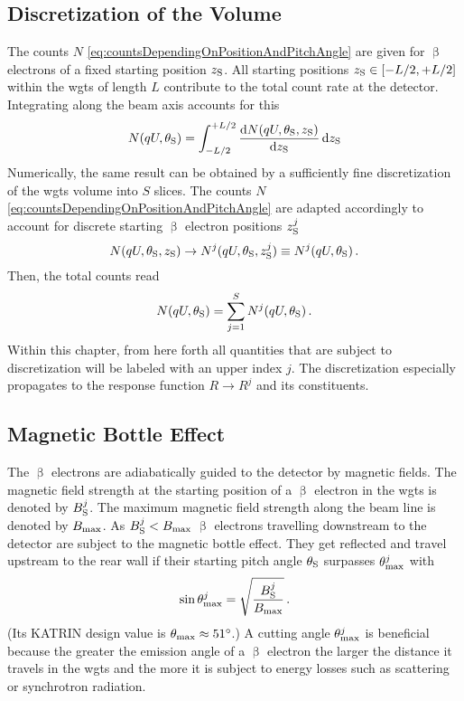 \subsection{Discretization of the  Volume}
\label{sec:sourceDiscretization}
The counts $N$ \eqref{eq:countsDependingOnPositionAndPitchAngle} are given for $\upbeta$ electrons of a fixed starting position $z_\mathrm{S}$.
All starting positions $z_\mathrm{S} \in [-L/2, +L/2]$ within the \gls{wgts} of length $L$ contribute to the total count rate at the detector. Integrating along the beam axis accounts for this
\begin{equation}
    N(qU, \theta_\mathrm{S}) = \int_{-L/2}^{+L/2} \frac{\mathop{}\!\mathrm{d} N(qU, \theta_\mathrm{S}, z_\mathrm{S})}{\mathop{}\!\mathrm{d} z_\mathrm{S}} \mathop{}\!\mathrm{d} z_\mathrm{S}
\end{equation}
Numerically, the same result can be obtained by a sufficiently fine discretization of the \gls{wgts} volume into $S$ slices. The counts $N$ \eqref{eq:countsDependingOnPositionAndPitchAngle} are adapted accordingly to account for discrete starting $\upbeta$ electron positions $z_\mathrm{S}^j$
\begin{equation}
    N(qU, \theta_\mathrm{S}, z_\mathrm{S}) \rightarrow N^j(qU, \theta_\mathrm{S},z_\mathrm{S}^j) \equiv N^j(qU, \theta_\mathrm{S}) \text{\,.}
\end{equation}
Then, the total counts read
\begin{equation}
    \label{eq:nonAveragedCounts}
    N(qU, \theta_\mathrm{S}) = \sum_{j=1}^S N^j(qU, \theta_\mathrm{S}) \text{\,.}
\end{equation}
Within this chapter, from here forth all quantities that are subject to discretization will be labeled with an upper index $j$. The discretization especially propagates to the response function $R \rightarrow R^j$ and its constituents.

\subsection{Magnetic Bottle Effect}
The $\upbeta$ electrons are adiabatically guided to the detector by magnetic fields. The magnetic field strength at the starting position of a $\upbeta$ electron in the \gls{wgts} is denoted by $B^j_\mathrm{S}$. The maximum magnetic field strength along the beam line is denoted by $B_\mathrm{max}$. As $B^j_\mathrm{S}<B_\mathrm{max}$ $\upbeta$ electrons travelling downstream to the detector are subject to the magnetic bottle effect. They get reflected and travel upstream to the rear wall if their starting pitch angle $\theta_\mathrm{S}$ surpasses $\theta_\mathrm{max}^j$ with
\begin{equation}
    \label{eq:thetaMax}
    \sin\theta_\mathrm{max}^j = \sqrt{\frac{B^j_\mathrm{S}}{B_\mathrm{max}}} \text{\,.}
\end{equation}
(Its KATRIN design value is $\theta_\mathrm{max}\approx \SI{51}{\degree}$.) A cutting angle $\theta_\mathrm{max}^j$ is beneficial because the greater the emission angle of a $\upbeta$ electron the larger the distance it travels in the \gls{wgts} and the more it is subject to energy losses such as scattering or synchrotron radiation.


